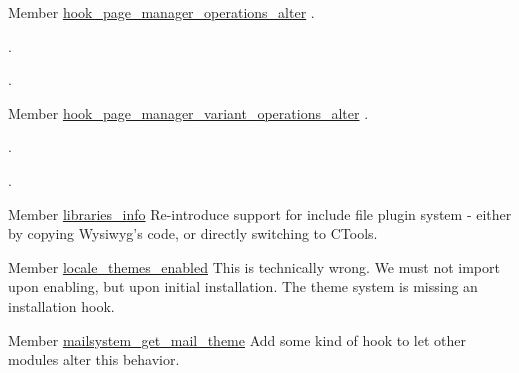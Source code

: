 \label{todo__todo000037}
\hypertarget{todo__todo000037}{}
 
\begin{DoxyDescription}
\item[Member \hyperlink{group__hooks_gadade57abdccc892f62ed6bc7f089ca29}{hook\_\-page\_\-manager\_\-operations\_\-alter} ].



. 

. 
\end{DoxyDescription}

\label{todo__todo000040}
\hypertarget{todo__todo000040}{}
 
\begin{DoxyDescription}
\item[Member \hyperlink{group__hooks_gaf5d4ce054cae22b3bdca52011c6e8fbc}{hook\_\-page\_\-manager\_\-variant\_\-operations\_\-alter} ].



. 

. 
\end{DoxyDescription}

\label{todo__todo000066}
\hypertarget{todo__todo000066}{}
 
\begin{DoxyDescription}
\item[Member \hyperlink{libraries_8module_ae592b03bbea251cc7c008cd5ed10c861}{libraries\_\-info} ]Re-\/introduce support for include file plugin system -\/ either by copying Wysiwyg's code, or directly switching to CTools. 
\end{DoxyDescription}

\label{todo__todo000016}
\hypertarget{todo__todo000016}{}
 
\begin{DoxyDescription}
\item[Member \hyperlink{locale_8module_a0378f720a467d804640a979f956dd442}{locale\_\-themes\_\-enabled} ]This is technically wrong. We must not import upon enabling, but upon initial installation. The theme system is missing an installation hook. 
\end{DoxyDescription}

\label{todo__todo000067}
\hypertarget{todo__todo000067}{}
 
\begin{DoxyDescription}
\item[Member \hyperlink{mailsystem_8module_af55c024d345c05de91cddc64ca83b7f7}{mailsystem\_\-get\_\-mail\_\-theme} ]Add some kind of hook to let other modules alter this behavior. 
\end{DoxyDescription}

